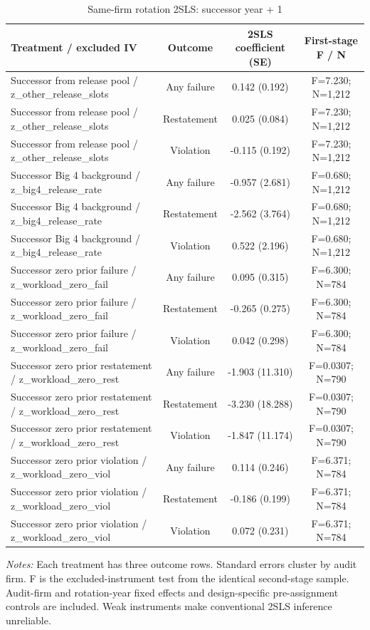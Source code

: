 \begin{table}[htbp]
\footnotesize
\centering
\caption{Same-firm rotation 2SLS: successor year + 1}
\begin{threeparttable}
\begin{tabular}{p{}ccc}
\toprule
Treatment / excluded IV & Outcome & 2SLS coefficient (SE) & First-stage F / N \\
\midrule
Successor from release pool / z\_other\_release\_slots & Any failure & 0.142 (0.192) & F=7.230; N=1,212 \\
Successor from release pool / z\_other\_release\_slots & Restatement & 0.025 (0.084) & F=7.230; N=1,212 \\
Successor from release pool / z\_other\_release\_slots & Violation & -0.115 (0.192) & F=7.230; N=1,212 \\
Successor Big 4 background / z\_big4\_release\_rate & Any failure & -0.957 (2.681) & F=0.680; N=1,212 \\
Successor Big 4 background / z\_big4\_release\_rate & Restatement & -2.562 (3.764) & F=0.680; N=1,212 \\
Successor Big 4 background / z\_big4\_release\_rate & Violation & 0.522 (2.196) & F=0.680; N=1,212 \\
Successor zero prior failure / z\_workload\_zero\_fail & Any failure & 0.095 (0.315) & F=6.300; N=784 \\
Successor zero prior failure / z\_workload\_zero\_fail & Restatement & -0.265 (0.275) & F=6.300; N=784 \\
Successor zero prior failure / z\_workload\_zero\_fail & Violation & 0.042 (0.298) & F=6.300; N=784 \\
Successor zero prior restatement / z\_workload\_zero\_rest & Any failure & -1.903 (11.310) & F=0.0307; N=790 \\
Successor zero prior restatement / z\_workload\_zero\_rest & Restatement & -3.230 (18.288) & F=0.0307; N=790 \\
Successor zero prior restatement / z\_workload\_zero\_rest & Violation & -1.847 (11.174) & F=0.0307; N=790 \\
Successor zero prior violation / z\_workload\_zero\_viol & Any failure & 0.114 (0.246) & F=6.371; N=784 \\
Successor zero prior violation / z\_workload\_zero\_viol & Restatement & -0.186 (0.199) & F=6.371; N=784 \\
Successor zero prior violation / z\_workload\_zero\_viol & Violation & 0.072 (0.231) & F=6.371; N=784 \\
\bottomrule
\end{tabular}
\begin{tablenotes}\footnotesize
\item \raggedright \textit{Notes:} Each treatment has three outcome rows. Standard errors cluster by audit firm. F is the excluded-instrument test from the identical second-stage sample. Audit-firm and rotation-year fixed effects and design-specific pre-assignment controls are included. Weak instruments make conventional 2SLS inference unreliable.
\end{tablenotes}
\end{threeparttable}
\end{table}
